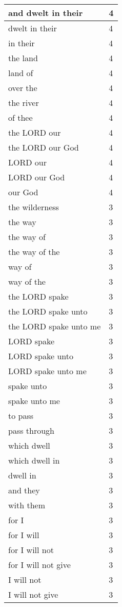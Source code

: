 \begin{center}
\begin{longtable}{|p{3.0in}|p{0.5in}|}
and dwelt in their & 4\\ \hline 
dwelt in their & 4\\ \hline 
in their & 4\\ \hline 
the land & 4\\ \hline 
land of & 4\\ \hline 
over the & 4\\ \hline 
the river & 4\\ \hline 
of thee & 4\\ \hline 
the LORD our & 4\\ \hline 
the LORD our God & 4\\ \hline 
LORD our & 4\\ \hline 
LORD our God & 4\\ \hline 
our God & 4\\ \hline 
the wilderness & 3\\ \hline 
the way & 3\\ \hline 
the way of & 3\\ \hline 
the way of the & 3\\ \hline 
way of & 3\\ \hline 
way of the & 3\\ \hline 
the LORD spake & 3\\ \hline 
the LORD spake unto & 3\\ \hline 
the LORD spake unto me & 3\\ \hline 
LORD spake & 3\\ \hline 
LORD spake unto & 3\\ \hline 
LORD spake unto me & 3\\ \hline 
spake unto & 3\\ \hline 
spake unto me & 3\\ \hline 
to pass & 3\\ \hline 
pass through & 3\\ \hline 
which dwell & 3\\ \hline 
which dwell in & 3\\ \hline 
dwell in & 3\\ \hline 
and they & 3\\ \hline 
with them & 3\\ \hline 
for I & 3\\ \hline 
for I will & 3\\ \hline 
for I will not & 3\\ \hline 
for I will not give & 3\\ \hline 
I will not & 3\\ \hline 
I will not give & 3\\ \hline 

\end{longtable}
\end{center}

